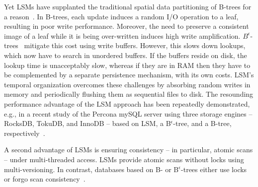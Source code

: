 Yet  LSMs have supplanted the  traditional spatial data partitioning of B-trees for a reason~\cite{rocks-vs-inno}.
In  B-trees, each update induces a random I/O operation to a leaf, resulting in poor write performance.
Moreover, the need to preserve a consistent image of a leaf while it is being over-written induces high write amplification. 
$B^{\epsilon}$-trees~\cite{Brodal:2003:LBE:644108.644201} mitigate this cost using write buffers. %
However, this slows down lookups, which now have to search in %
unordered buffers. 
If the buffers reside on disk, the lookup time is unacceptably slow, whereas
if they are in RAM then they have to be complemented by a separate persistence mechanism, with its own costs.  
LSM's temporal organization overcomes these challenges by absorbing random writes in memory and periodically flushing them as 
sequential files to disk. 
The resounding performance advantage of the LSM approach  has been repeatedly demonstrated, 
e.g., in a recent  study of the Percona mySQL server using three storage engines -- RocksDB, TokuDB, and InnoDB --
based on LSM, a B$^{\epsilon}$-tree, and a B-tree, respectively~\cite{toku-rocks-inno}.




 
A second advantage of LSMs is ensuring consistency -- in particular, atomic scans --   under multi-threaded access. 
LSMs provide atomic scans without locks using multi-versioning. 
In contrast, databases based on B- or  B$^\epsilon$-trees either use locks~\cite{innodblocking} 
or forgo scan consistency~\cite{tucana}.


